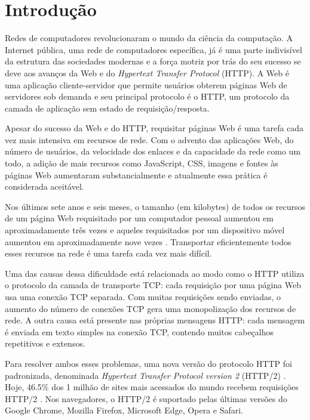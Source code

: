 \chapter{Introdução}
\label{cap:intro}

Redes de computadores revolucionaram o mundo da ciência da computação. A Internet pública, uma rede de computadores específica, já é uma parte indivisível da estrutura das sociedades modernas e a força motriz por trás do seu sucesso se deve aos avanços da Web e do {\em Hypertext Transfer Protocol} (HTTP). A Web é uma aplicação cliente-servidor que permite usuários obterem páginas Web de servidores sob demanda e seu principal protocolo é o HTTP, um protocolo da camada de aplicação sem estado de requisição\slash resposta.

Apesar do sucesso da Web e do HTTP, requisitar páginas Web é uma tarefa cada vez mais intensiva em recursos de rede. Com o advento das aplicações Web, do número de usuários, da velocidade dos enlaces e da capacidade da rede como um todo, a adição de mais recursos como JavaScript, CSS, imagens e fontes às páginas Web aumentaram substancialmente e atualmente essa prática é considerada aceitável.

Nos últimos sete anos e seis meses, o tamanho (em kilobytes) de todos os recursos de um página Web requisitado por um computador pessoal aumentou em aproximadamente três vezes e aqueles requisitados por um dispositivo móvel aumentou em aproximadamente nove vezes \cite{HTTPArchive}. Transportar eficientemente todos esses recursos na rede é uma tarefa cada vez mais difícil.

Uma das causas dessa dificuldade está relacionada ao modo como o HTTP utiliza o protocolo da camada de transporte TCP: cada requisição por uma página Web usa uma conexão TCP separada. Com muitas requisições sendo enviadas, o aumento do número de conexões TCP gera uma monopolização dos recursos de rede. A outra causa está presente nas próprias mensagens HTTP: cada mensagem é enviada em texto simples na conexão TCP, contendo muitos cabeçalhos repetitivos e extensos.

Para resolver ambos esses problemas, uma nova versão do protocolo HTTP foi padronizada, denominada {\em Hypertext Transfer Protocol version 2} (HTTP/2) \cite{BelsheRFC7540}. Hoje, 46.5\% dos 1 milhão de sites mais acessados do mundo recebem requisições HTTP/2 \cite{HTTPArchive}. Nos navegadores, o HTTP/2 é suportado pelas últimas versões do Google Chrome, Mozilla Firefox, Microsoft Edge, Opera e Safari.

